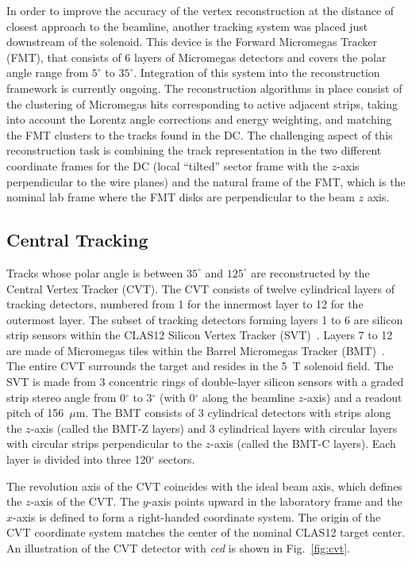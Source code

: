In order to improve the accuracy of the vertex reconstruction at the distance of closest approach to the beamline,
another tracking system was placed just downstream of the solenoid. This device is the Forward Micromegas Tracker
(FMT), that consists of 6 layers of Micromegas detectors and covers the polar angle range from $5^\circ$ to
$35^\circ$.  Integration of this system into the reconstruction framework is currently ongoing. The reconstruction
algorithms in place consist of the clustering of Micromegas hits corresponding to active adjacent strips, taking
into account the Lorentz angle corrections and energy weighting, and matching the FMT clusters to the tracks found
in the DC. The challenging aspect of this reconstruction task is combining the track representation in the two different
coordinate frames for the DC (local ``tilted'' sector frame with the $z$-axis perpendicular to the wire planes) and
the natural frame of the FMT, which is the nominal lab frame where the FMT disks are perpendicular to the beam
$z$ axis. 

\subsection{Central Tracking}
\label{sec:cvt}

Tracks whose polar angle is between $35^\circ$ and $125^\circ$ are reconstructed by the Central Vertex Tracker
(CVT). The CVT consists of twelve cylindrical layers of tracking detectors, numbered from 1 for the innermost layer
to 12 for the outermost layer. The subset of tracking detectors forming layers 1 to 6 are silicon strip sensors within
the CLAS12 Silicon Vertex Tracker (SVT)~\cite{svt-nim}. Layers 7 to 12 are made of Micromegas tiles within the
Barrel Micromegas Tracker (BMT)~\cite{mm-nim}. The entire CVT surrounds the target and resides in the 5~T
solenoid field. The SVT is made from 3 concentric rings of double-layer silicon sensors with a graded strip stereo
angle from 0$^\circ$ to 3$^\circ$ (with 0$^\circ$ along the beamline $z$-axis) and a readout pitch of 156~$\mu$m.
The BMT consists of 3 cylindrical detectors with strips along the $z$-axis (called the BMT-Z layers) and 3
cylindrical layers with circular layers with circular strips perpendicular to the $z$-axis (called the BMT-C layers).
Each layer is divided into three 120$^\circ$ sectors.

The revolution axis of the CVT coincides with the ideal beam axis, which defines the $z$-axis of the CVT. The
$y$-axis points upward in the laboratory frame and the $x$-axis is defined to form a right-handed coordinate
system. The origin of the CVT coordinate system matches the center of the nominal CLAS12 target center. An
illustration of the CVT detector with {\it ced} is shown in Fig.~\ref{fig:cvt}.


